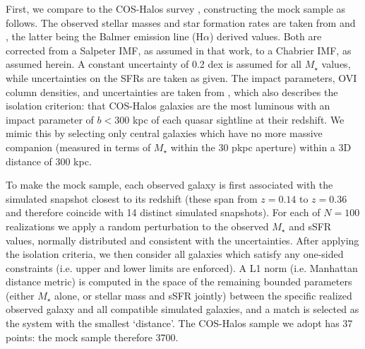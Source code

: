 \documentclass[useAMS,usenatbib]{mnras}
\newcommand{\ovi}{OVI\xspace}
\begin{document}
First, we compare to the COS-Halos survey \citep{tumlinson11}, constructing the mock sample as follows. The observed stellar masses and star formation rates are taken from \cite{werk12} and \cite{werk13}, the latter being the Balmer emission line (H$\alpha$) derived values. Both are corrected from a Salpeter IMF, as assumed in that work, to a Chabrier IMF, as assumed herein. A constant uncertainty of 0.2 dex is assumed for all $M_\star$ values, while uncertainties on the SFRs are taken as given. The impact parameters, \ovi column densities, and uncertainties are taken from \cite{tumlinson11}, which also describes the isolation criterion: that COS-Halos galaxies are the most luminous with an impact parameter of $b < 300$ kpc of each quasar sightline at their redshift. We mimic this by selecting only central galaxies which have no more massive companion (measured in terms of $M_\star$ within the 30 pkpc aperture) within a 3D distance of 300 kpc.

To make the mock sample, each observed galaxy is first associated with the simulated snapshot closest to its redshift (these span from $z=0.14$ to $z=0.36$ and therefore coincide with 14 distinct simulated snapshots). For each of $N=100$ realizations we apply a random perturbation to the observed $M_\star$ and sSFR values, normally distributed and consistent with the uncertainties. After applying the isolation criteria, we then consider all galaxies which satisfy any one-sided constraints (i.e. upper and lower limits are enforced). A L1 norm (i.e. Manhattan distance metric) is computed in the space of the remaining bounded parameters (either $M_\star$ alone, or stellar mass and sSFR jointly) between the specific realized observed galaxy and all compatible simulated galaxies, and a match is selected as the system with the smallest `distance'. The COS-Halos sample we adopt has 37 points: the mock sample therefore 3700. 
\end{document}
